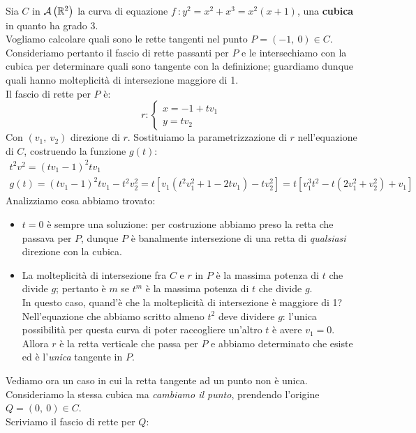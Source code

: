 \begin{example} \label{esempiocurvaq}	Sia $C$ in ${\mathcal{A}\left(\mathbb{R}^2\right)}$ la curva di equazione $f\ \colon y^2=x^2+x^3=x^2(x+1)$, una \textbf{cubica} in quanto ha grado 3.\\
Vogliamo calcolare quali sono le rette tangenti nel punto $P=(-1,\ 0)\in C$. Consideriamo pertanto il fascio di rette passanti per $P$ e le intersechiamo con la cubica per determinare quali sono tangente con la definizione; guardiamo dunque quali hanno molteplicità di intersezione maggiore di 1.\\
Il fascio di rette per $P$ è:
\begin{equation*}
	r\colon \begin{cases}
		x=-1+tv_1\\
		y=tv_2
	\end{cases}
\end{equation*}
Con $(v_1,\ v_2)$ direzione di $r$. Sostituiamo la parametrizzazione di $r$ nell'equazione di $C$, costruendo la funzione $g\left(t\right)$:
	\begin{gather*}
		t^2v^2=(tv_1-1)^2 tv_1\\
		g(t)=(tv_1-1)^2tv_1-t^2v_2^2=t[v_1(t^2v_1^2+1-2tv_1)-tv_2^2]=t[v_1^3t^2-t(2v_1^2+v_2^2)+v_1]
	\end{gather*}
	Analizziamo cosa abbiamo trovato:
		\begin{itemize}
			\item $t=0$ è sempre una soluzione: per costruzione abbiamo preso la retta che passava per $P$, dunque $P$ è banalmente intersezione di una retta di \textit{qualsiasi} direzione con la cubica.
			\item La molteplicità di intersezione fra $C$ e $r$ in $P$ è la massima potenza di $t$ che divide $g$; pertanto è $m$ se $t^m$ è la massima potenza di $t$ che divide $g$.\\
			In questo caso, quand'è che la molteplicità di intersezione è maggiore di 1? Nell'equazione che abbiamo scritto almeno $t^2$ deve dividere $g$: l'unica possibilità per questa curva di poter raccogliere un'altro $t$ è avere $v_1=0$. Allora $r$ è la retta verticale che passa per $P$ e abbiamo determinato che esiste ed è l'\textit{unica} tangente in $P$.
		\end{itemize}
	Vediamo ora un caso in cui la retta tangente ad un punto non è unica. Consideriamo la stessa cubica ma \textit{cambiamo il punto}, prendendo l'origine $Q=\left(0,\ 0\right)\in C$.\\
	Scriviamo il fascio di rette per $Q$:
	\begin{equation*}

\end{equation*}
\end{example}
